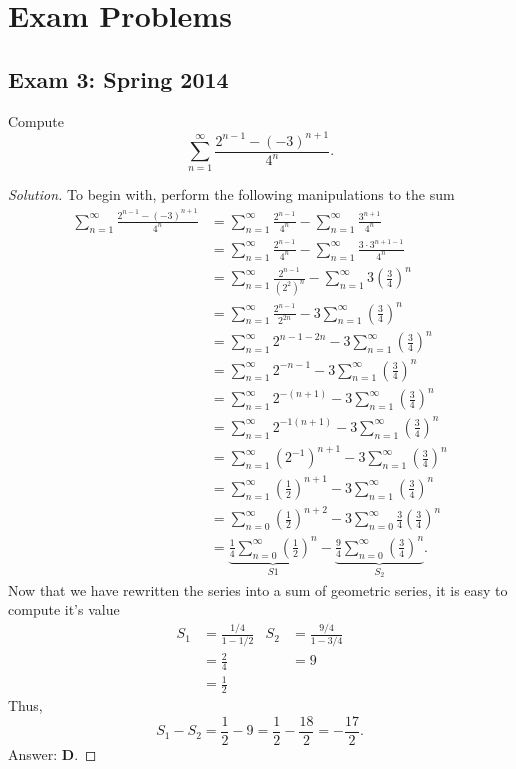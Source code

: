 \chapter{Exam Problems}
\section{Exam 3: Spring 2014}
\setcounter{exercise}{0}
\begin{problem}
Compute
\[
\sum_{n=1}^\infty \frac{2^{n-1}-(-3)^{n+1}}{4^n}.
\]
\end{problem}
\begin{proof}[Solution]
To begin with, perform the following manipulations to the sum
\begin{align*}
\sum_{n=1}^\infty \frac{2^{n-1}-(-3)^{n+1}}{4^n}
&=\sum_{n=1}^\infty\frac{2^{n-1}}{4^n}-\sum_{n=1}^\infty\frac{3^{n+1}}{4^n}\\
&=\sum_{n=1}^\infty\frac{2^{n-1}}{4^n}-\sum_{n=1}^\infty\frac{3\cdot
  3^{n+1-1}}{4^n}\\
&=\sum_{n=1}^\infty\frac{2^{n-1}}{{(2^2)}^n}-\sum_{n=1}^\infty3
  \left(\frac{3}{4}\right)^n\\
&=\sum_{n=1}^\infty\frac{2^{n-1}}{2^{2n}}-3\sum_{n=1}^\infty\left(\frac{3}{4}\right)^n\\
&=\sum_{n=1}^\infty2^{n-1-2n}-3\sum_{n=1}^\infty\left(\frac{3}{4}\right)^n\\
&=\sum_{n=1}^\infty2^{-n-1}-3\sum_{n=1}^\infty\left(\frac{3}{4}\right)^n\\
&=\sum_{n=1}^\infty2^{-(n+1)}-3\sum_{n=1}^\infty\left(\frac{3}{4}\right)^n\\
&=\sum_{n=1}^\infty2^{-1(n+1)}-3\sum_{n=1}^\infty\left(\frac{3}{4}\right)^n\\
&=\sum_{n=1}^\infty{(2^{-1})}^{n+1}-3\sum_{n=1}^\infty\left(\frac{3}{4}\right)^n\\
&=\sum_{n=1}^\infty\left({\frac{1}{2}}\right)^{n+1}-3\sum_{n=1}^\infty\left(\frac{3}{4}\right)^n\\
&=\sum_{n=0}^\infty\left({\frac{1}{2}}\right)^{n+2}-3\sum_{n=0}^\infty\frac{3}{4}\left(\frac{3}{4}\right)^n\\
&=\underbrace{\frac{1}{4}\sum_{n=0}^\infty\left({\frac{1}{2}}\right)^{n}}_{S1}
-\underbrace{\frac{9}{4}\sum_{n=0}^\infty\left(\frac{3}{4}\right)^n}_{S_2}.
\end{align*}
Now that we have rewritten the series into a sum of geometric series, it is
easy to compute it's value
\[
\begin{aligned}
S_1&=\frac{1/4}{1-1/2}&S_2&=\frac{9/4}{1-3/4}\\
&=\frac{2}{4}&&=9\\
&=\frac{1}{2}
\end{aligned}
\]
Thus,
\[
S_1-S_2=\frac{1}{2}-9=\frac{1}{2}-\frac{18}{2}=-\frac{17}{2}.
\]
Answer: \textbf{D}.
\end{proof}
